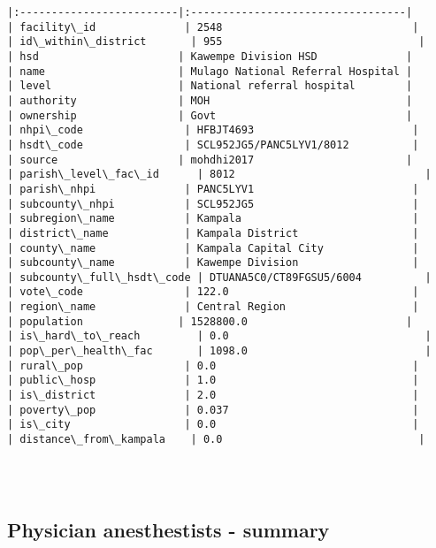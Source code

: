 \documentclass[11pt]{article}
\begin{document}
\begin{Verbatim}[commandchars=\\\{\}]
|:-------------------------|:----------------------------------|
| facility\_id              | 2548                              |
| id\_within\_district       | 955                               |
| hsd                      | Kawempe Division HSD              |
| name                     | Mulago National Referral Hospital |
| level                    | National referral hospital        |
| authority                | MOH                               |
| ownership                | Govt                              |
| nhpi\_code                | HFBJT4693                         |
| hsdt\_code                | SCL952JG5/PANC5LYV1/8012          |
| source                   | mohdhi2017                        |
| parish\_level\_fac\_id      | 8012                              |
| parish\_nhpi              | PANC5LYV1                         |
| subcounty\_nhpi           | SCL952JG5                         |
| subregion\_name           | Kampala                           |
| district\_name            | Kampala District                  |
| county\_name              | Kampala Capital City              |
| subcounty\_name           | Kawempe Division                  |
| subcounty\_full\_hsdt\_code | DTUANA5C0/CT89FGSU5/6004          |
| vote\_code                | 122.0                             |
| region\_name              | Central Region                    |
| population               | 1528800.0                         |
| is\_hard\_to\_reach         | 0.0                               |
| pop\_per\_health\_fac       | 1098.0                            |
| rural\_pop                | 0.0                               |
| public\_hosp              | 1.0                               |
| is\_district              | 2.0                               |
| poverty\_pop              | 0.037                             |
| is\_city                  | 0.0                               |
| distance\_from\_kampala    | 0.0                               |




    \end{Verbatim}

    \hypertarget{physician-anesthestists---summary}{%
\subsection{Physician anesthestists -
summary}\label{physician-anesthestists---summary}}
\end{document}
